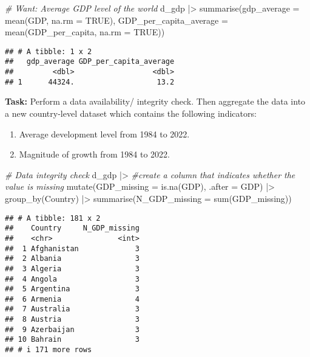 \documentclass[
]{article}
\newenvironment{Shaded}{\begin{snugshade}}{\end{snugshade}}
\newcommand{\AttributeTok}[1]{\textcolor[rgb]{0.77,0.63,0.00}{#1}}
\newcommand{\CommentTok}[1]{\textcolor[rgb]{0.56,0.35,0.01}{\textit{#1}}}
\newcommand{\ConstantTok}[1]{\textcolor[rgb]{0.00,0.00,0.00}{#1}}
\newcommand{\FunctionTok}[1]{\textcolor[rgb]{0.00,0.00,0.00}{#1}}
\newcommand{\NormalTok}[1]{#1}
\newcommand{\SpecialCharTok}[1]{\textcolor[rgb]{0.00,0.00,0.00}{#1}}
\begin{document}
\begin{Shaded}
\begin{Highlighting}[]
\CommentTok{\# Want: Average GDP level of the world}
\NormalTok{d\_gdp }\SpecialCharTok{|\textgreater{}} \FunctionTok{summarise}\NormalTok{(}\AttributeTok{gdp\_average =} \FunctionTok{mean}\NormalTok{(GDP, }\AttributeTok{na.rm =} \ConstantTok{TRUE}\NormalTok{),}
                   \AttributeTok{GDP\_per\_capita\_average =} \FunctionTok{mean}\NormalTok{(GDP\_per\_capita, }\AttributeTok{na.rm =} \ConstantTok{TRUE}\NormalTok{))}
\end{Highlighting}
\end{Shaded}

\begin{verbatim}
## # A tibble: 1 x 2
##   gdp_average GDP_per_capita_average
##         <dbl>                  <dbl>
## 1      44324.                   13.2
\end{verbatim}

\textbf{Task:} Perform a data availability/ integrity check. Then
aggregate the data into a new country-level dataset which contains the
following indicators:

\begin{enumerate}
\def\labelenumi{\arabic{enumi}.}
\item
  Average development level from 1984 to 2022.
\item
  Magnitude of growth from 1984 to 2022.
\end{enumerate}

\begin{Shaded}
\begin{Highlighting}[]
\CommentTok{\# Data integrity check}
\NormalTok{d\_gdp }\SpecialCharTok{|\textgreater{}}
  \CommentTok{\#create a column that indicates whether the value is missing}
  \FunctionTok{mutate}\NormalTok{(}\AttributeTok{GDP\_missing =} \FunctionTok{is.na}\NormalTok{(GDP), }\AttributeTok{.after =}\NormalTok{ GDP) }\SpecialCharTok{|\textgreater{}}
  \FunctionTok{group\_by}\NormalTok{(Country) }\SpecialCharTok{|\textgreater{}}
  \FunctionTok{summarise}\NormalTok{(}\AttributeTok{N\_GDP\_missing =} \FunctionTok{sum}\NormalTok{(GDP\_missing))}
\end{Highlighting}
\end{Shaded}

\begin{verbatim}
## # A tibble: 181 x 2
##    Country     N_GDP_missing
##    <chr>               <int>
##  1 Afghanistan             3
##  2 Albania                 3
##  3 Algeria                 3
##  4 Angola                  3
##  5 Argentina               3
##  6 Armenia                 4
##  7 Australia               3
##  8 Austria                 3
##  9 Azerbaijan              3
## 10 Bahrain                 3
## # i 171 more rows
\end{verbatim}
\end{document}

